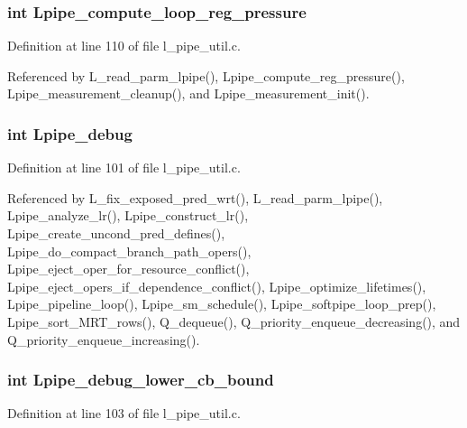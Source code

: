 \subsubsection{\setlength{\rightskip}{0pt plus 5cm}int \bf{Lpipe\_\-compute\_\-loop\_\-reg\_\-pressure}}\label{l__pipe__util_8h_05b449c92ca8c59d61db6054cd56e7ee}




Definition at line 110 of file l\_\-pipe\_\-util.c.

Referenced by L\_\-read\_\-parm\_\-lpipe(), Lpipe\_\-compute\_\-reg\_\-pressure(), Lpipe\_\-measurement\_\-cleanup(), and Lpipe\_\-measurement\_\-init().
\subsubsection{\setlength{\rightskip}{0pt plus 5cm}int \bf{Lpipe\_\-debug}}\label{l__pipe__util_8h_ad83dd0fea79c90886829873235d97be}




Definition at line 101 of file l\_\-pipe\_\-util.c.

Referenced by L\_\-fix\_\-exposed\_\-pred\_\-wrt(), L\_\-read\_\-parm\_\-lpipe(), Lpipe\_\-analyze\_\-lr(), Lpipe\_\-construct\_\-lr(), Lpipe\_\-create\_\-uncond\_\-pred\_\-defines(), Lpipe\_\-do\_\-compact\_\-branch\_\-path\_\-opers(), Lpipe\_\-eject\_\-oper\_\-for\_\-resource\_\-conflict(), Lpipe\_\-eject\_\-opers\_\-if\_\-dependence\_\-conflict(), Lpipe\_\-optimize\_\-lifetimes(), Lpipe\_\-pipeline\_\-loop(), Lpipe\_\-sm\_\-schedule(), Lpipe\_\-softpipe\_\-loop\_\-prep(), Lpipe\_\-sort\_\-MRT\_\-rows(), Q\_\-dequeue(), Q\_\-priority\_\-enqueue\_\-decreasing(), and Q\_\-priority\_\-enqueue\_\-increasing().
\subsubsection{\setlength{\rightskip}{0pt plus 5cm}int \bf{Lpipe\_\-debug\_\-lower\_\-cb\_\-bound}}\label{l__pipe__util_8h_4ebe475f1a840fbaa32b10d000fd7f70}




Definition at line 103 of file l\_\-pipe\_\-util.c.

